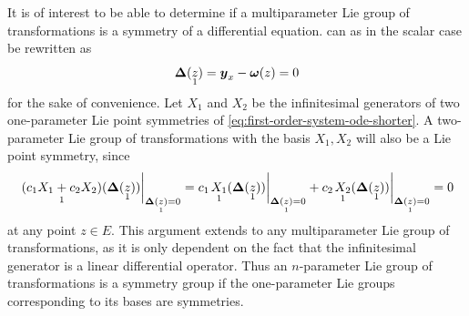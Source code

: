 It is of interest to be able to determine if a multiparameter Lie group of transformations is a symmetry of a differential equation.
 can as in the scalar case be rewritten as
\begin{equation} \label{eq:first-order-system-ode-shorter}
  \vect{\Delta}(\prolong{z}{1}) = \vect{y}_x - \vect{\omega}(z) = 0
\end{equation}
for the sake of convenience.
Let \(X_1\) and \(X_2\) be the infinitesimal generators of two one-parameter Lie point symmetries of \cref{eq:first-order-system-ode-shorter}.
A two-parameter Lie group of transformations with the basis \(X_1, X_2\) will also be a Lie point symmetry, since
\begin{equation*}
  \eval{\prolong{(c_1 X_1 + c_2 X_2)}{1}(\vect{\Delta}(\prolong{z}{1}))}_{\vect{\Delta}(\prolong{z}{1}) = 0} = c_1 \eval{\prolong{X_1}{1}(\vect{\Delta}(\prolong{z}{1}))}_{\vect{\Delta}(\prolong{z}{1}) = 0} + c_2 \eval{\prolong{X_2}{1}(\vect{\Delta}(\prolong{z}{1}))}_{\vect{\Delta}(\prolong{z}{1}) = 0} =
  0
\end{equation*}
at any point \(z \in E\).
This argument extends to any multiparameter Lie group of transformations, as it is only dependent on the fact that the infinitesimal generator is a linear differential operator.
Thus an \(n\)-parameter Lie group of transformations is a symmetry group if the one-parameter Lie groups corresponding to its bases are symmetries.

